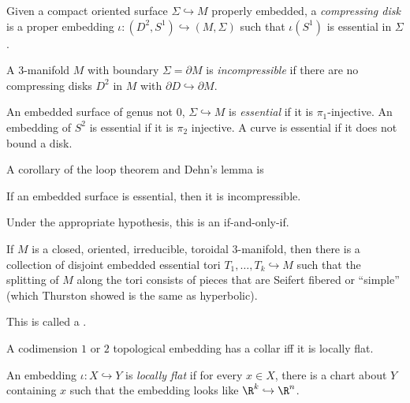\documentclass[a4paper]{article}
\begin{document}
\begin{defi}
  Given a compact oriented surface $\Sigma \hookrightarrow M$ properly embedded, a \emph{compressing disk} is a proper embedding $\iota: (D^2, S^1) \hookrightarrow (M, \Sigma)$ such that $\iota(S^1)$ is essential in $\Sigma$.
\end{defi}

\begin{defi}
  A $3$-manifold $M$ with boundary $\Sigma = \partial M$ is \emph{incompressible} if there are no compressing disks $D^2$ in $M$ with $\partial D \hookrightarrow \partial M$.
\end{defi}

\begin{defi}
  An embedded surface of genus not $0$, $\Sigma \hookrightarrow M$ is \emph{essential} if it is $\pi_1$-injective. An embedding of $S^2$ is essential if it is $\pi_2$ injective. A curve is essential if it does not bound a disk.
\end{defi}

A corollary of the loop theorem and Dehn's lemma is
\begin{thm}
  If an embedded surface is essential, then it is incompressible.
\end{thm}
Under the appropriate hypothesis, this is an if-and-only-if.

\begin{thm} %
  If $M$ is a closed, oriented, irreducible, toroidal $3$-manifold, then there is a collection of disjoint embedded essential tori $T_1, \ldots, T_k \hookrightarrow M$ such that the splitting of $M$ along the tori consists of pieces that are Seifert fibered or ``simple'' (which Thurston showed is the same as hyperbolic).
\end{thm}
This is called a .

\begin{thm} %
  A codimension $1$ or $2$ topological embedding has a collar iff it is locally flat.
\end{thm}

\begin{defi}
  An embedding $\iota: X \hookrightarrow Y$ is \emph{locally flat} if for every $x \in X$, there is a chart about $Y$ containing $x$ such that the embedding looks like $\R^k \hookrightarrow \R^n$.
\end{defi}
\end{document}
